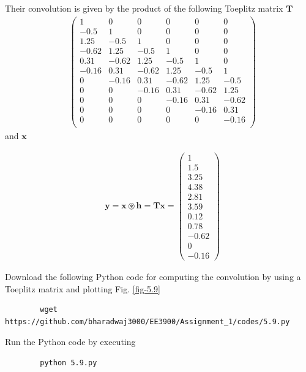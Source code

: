 \documentclass[journal,12pt,twocolumn]{IEEEtran}
\let\vec\mathbf
\numberwithin{equation}{section}
\renewcommand\thesection{\arabic{section}}
\newcommand{\myvec}[1]{\ensuremath{\begin{pmatrix}#1\end{pmatrix}}}
\begin{document}
\begin{enumerate}[label=\thesection.\arabic*]
	Their convolution is given by the product of the following Toeplitz matrix $\vec{T}$
	\begin{align}
		&\myvec{
			1 & 0 & 0 & 0 & 0 & 0 \\
			-0.5 & 1 & 0 & 0 & 0 & 0 \\
			1.25 & -0.5 & 1 & 0 & 0 & 0 \\
			-0.62 & 1.25 & -0.5 & 1 & 0 & 0 \\
			0.31 & -0.62 & 1.25 & -0.5 & 1 & 0 \\
			-0.16 & 0.31 & -0.62 & 1.25 & -0.5 & 1 \\
			0 & -0.16 & 0.31 & -0.62 & 1.25 & -0.5 \\
			0 & 0 & -0.16 & 0.31 & -0.62 & 1.25 \\
			0 & 0 & 0 & -0.16 & 0.31 & -0.62 \\
			0 & 0 & 0 & 0 & -0.16 & 0.31 \\
			0 & 0 & 0 & 0 & 0 & -0.16 \\
		} 
	\end{align}
	and $\vec{x}$
	
	\begin{align}
		&\vec{y} = \vec{x} \circledast \vec{h} = \vec{Tx} = \myvec{1 \\ 1.5 \\ 3.25 \\ 4.38 \\ 2.81 \\ 3.59 \\ 0.12 \\ 0.78 \\ -0.62 \\ 0 \\ -0.16}
	\end{align}
	
	Download the following Python code for computing the convolution by using a Toeplitz matrix and plotting Fig. \ref{fig-5.9}
	\begin{lstlisting}
		wget https://github.com/bharadwaj3000/EE3900/Assignment_1/codes/5.9.py
	\end{lstlisting}
	
	Run the Python code by executing
	\begin{lstlisting}
		python 5.9.py
	\end{lstlisting}


\end{enumerate}
\end{document}
